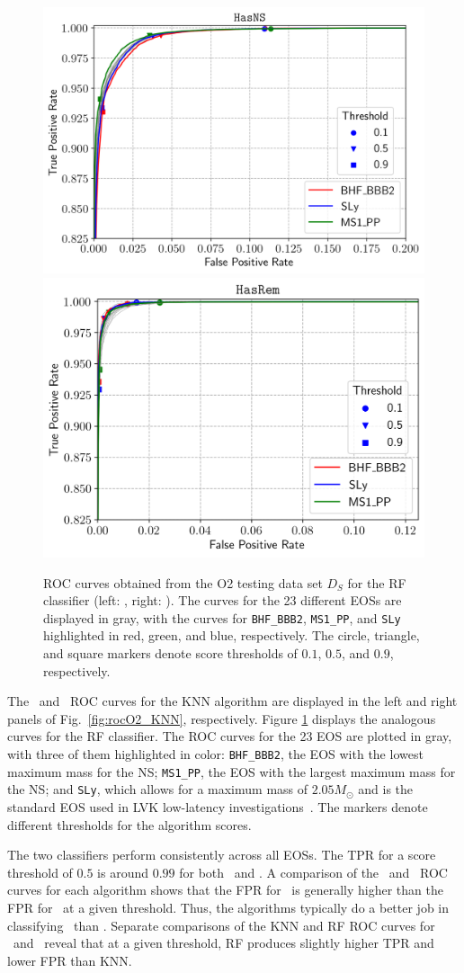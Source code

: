 \begin{figure}%
\includegraphics[width=0.47\linewidth]{roc_testing_RF_NS}
\includegraphics[width=0.45\linewidth]{roc_testing_RF_REM}
\caption{\ac{ROC} curves obtained from the \ac{O2} testing data set $D_S$ for the \ac{RF} classifier (left: \hasns, right: \hasrem). The curves for the 23 different \ac{EOS}s are displayed in
gray, with the curves for {\tt BHF\_BBB2}, {\tt MS1\_PP}, and {\tt SLy} highlighted in red, green, and blue, respectively. The circle, triangle, and square markers denote score thresholds of
$0.1$, $0.5$, and $0.9$, respectively.}
\label{fig:rocO2_RF}
\end{figure}

The \hasns\ and \hasrem\ \ac{ROC} curves for the  \ac{KNN} algorithm are displayed in the left and right panels of Fig.~\ref{fig:rocO2_KNN}, respectively. Figure \ref{fig:rocO2_RF} displays the analogous curves for the \ac{RF} classifier. The \ac{ROC} curves for the 23 \ac{EOS} are plotted in gray, with three of them highlighted in color: {\tt BHF\_BBB2}, the \ac{EOS}
with the lowest maximum mass for the NS; {\tt MS1\_PP}, the \ac{EOS} with the largest maximum mass for the \ac{NS}; and {\tt SLy}, which allows for a maximum mass of $2.05 M_\odot$ and is
the standard \ac{EOS} used in \ac{LVK} low-latency investigations~\cite{Ghosh:2021eqv}. The markers denote different thresholds for the algorithm scores. 

The two classifiers perform consistently across all \ac{EOS}s. The \ac{TPR} for a score threshold of $0.5$ is around $0.99$ for both \hasns\ and \hasrem. A comparison of the
\hasns\ and \hasrem\ \ac{ROC} curves for each algorithm shows that the \ac{FPR} for \hasns\ is generally higher than the \ac{FPR} for \hasrem\ at a given threshold. Thus, the algorithms
typically do a better job in classifying \hasrem\ than \hasns. Separate comparisons of the \ac{KNN} and \ac{RF} \ac{ROC} curves for \hasns\ and \hasrem\ reveal that at a given threshold, \ac{RF} produces slightly higher \ac{TPR} and lower \ac{FPR} than \ac{KNN}.

